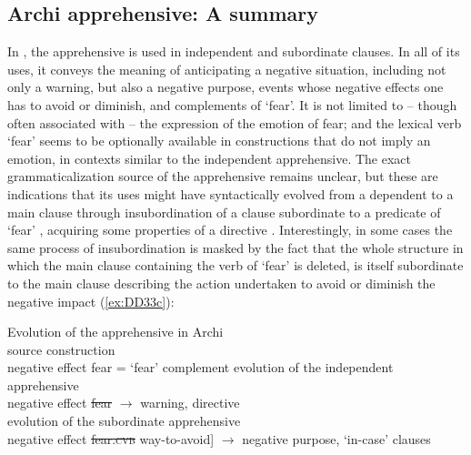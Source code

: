 \documentclass[output=paper,colorlinks,citecolor=brown]{langscibook}
\begin{document}
\subsection{Archi apprehensive: A summary}
\label{subsec:Aapprehensive}
 
In , the apprehensive is used in independent and subordinate clauses. In all of its uses, it conveys the meaning of anticipating a negative situation, including not only a warning, but also a negative purpose, events whose negative effects one has to avoid or diminish, and complements of `fear'. It is not limited to -- though often associated with -- the expression of the emotion of fear; and the lexical verb `fear' seems to be optionally available in constructions that do not imply an emotion, in contexts similar to the independent apprehensive. The exact grammaticalization source of the apprehensive remains unclear, but these are indications that its uses might have syntactically evolved from a dependent to a main clause through insubordination of a clause subordinate to a predicate of `fear' , acquiring some properties of a directive . Interestingly, in some cases the same process of insubordination is masked by the fact that the whole structure in which the main clause containing the verb of `fear' is deleted, is itself subordinate to the main clause describing the action undertaken to avoid or diminish the negative impact (\ref{ex:DD33c}):%
 
    \ea \label{ex:DD33} \textnormal{Evolution of the apprehensive in Archi} \\
\ea \label{ex:DD33a} \textnormal{source construction} \\
\textnormal{{\ob\ob}negative effect{\cb} fear{\cb} = `fear' complement}
\ex \label{ex:DD33b} \textnormal{evolution of the independent apprehensive} \\
\textnormal{{\ob\ob}negative effect{\cb} \sout{fear}{\cb} $\rightarrow$ warning, directive} \\
\ex \label{ex:DD33c}\textnormal{evolution of the subordinate apprehensive }\\
\textnormal{{\ob\ob\ob}negative effect{\cb} \sout{fear.\textsc{cvb}}{\cb} way-to-avoid] $\rightarrow$ negative purpose, `in-case' clauses} \\
\z
\z
\end{document}
